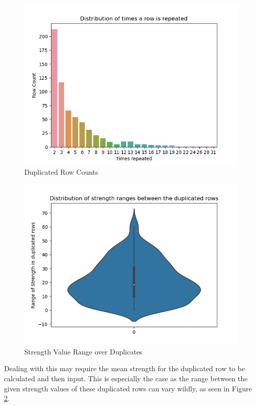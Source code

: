 \documentclass[onecolumn, 11pt]{article}
\begin{document}
\begin{figure}[!ht]
  \centering
    \includegraphics[width=\textwidth]{Figures/dup_number_dist.png}
  \caption{Duplicated Row Counts}
  \label{fig:dup_distribution}
\end{figure}

\begin{figure}[!ht]
  \centering
		\includegraphics[width=\textwidth]{Figures/strength_range_dist.png}
  \caption{Strength Value Range over Duplicates}
	\label{fig:range_distribution}
\end{figure}

Dealing with this may require the mean strength for the duplicated row to be calculated and then input. This is especially the case as the range between the given strength values of these duplicated rows can vary wildly, as seen in Figure \ref{fig:range_distribution}.
\end{document}
